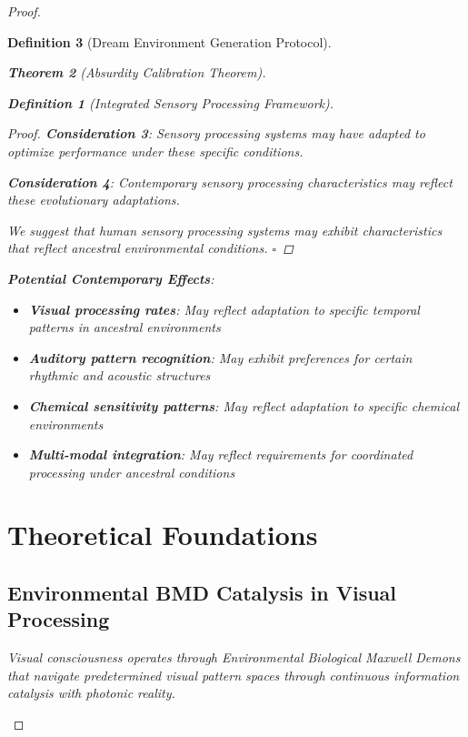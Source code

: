\documentclass[12pt,a4paper]{article}
\newtheorem{theorem}{Theorem}[section]
\newtheorem{definition}[theorem]{Definition}
\begin{document}
\begin{proof}
\begin{definition}[Dream Environment Generation Protocol]
\begin{theorem}[Absurdity Calibration Theorem]
\begin{observation}
\begin{definition}[Integrated Sensory Processing Framework]
\begin{proof}
\textbf{Consideration 3}: Sensory processing systems may have adapted to optimize performance under these specific conditions.

\textbf{Consideration 4}: Contemporary sensory processing characteristics may reflect these evolutionary adaptations.

We suggest that human sensory processing systems may exhibit characteristics that reflect ancestral environmental conditions. $\square$
\end{proof}

\textbf{Potential Contemporary Effects}:
\begin{itemize}
\item \textbf{Visual processing rates}: May reflect adaptation to specific temporal patterns in ancestral environments
\item \textbf{Auditory pattern recognition}: May exhibit preferences for certain rhythmic and acoustic structures
\item \textbf{Chemical sensitivity patterns}: May reflect adaptation to specific chemical environments
\item \textbf{Multi-modal integration}: May reflect requirements for coordinated processing under ancestral conditions
\end{itemize}

\section{Theoretical Foundations}

\subsection{Environmental BMD Catalysis in Visual Processing}

Visual consciousness operates through Environmental Biological Maxwell Demons that navigate predetermined visual pattern spaces through continuous information catalysis with photonic reality.


\end{definition}
\end{observation}
\end{theorem}
\end{definition}
\end{proof}
\end{document}
